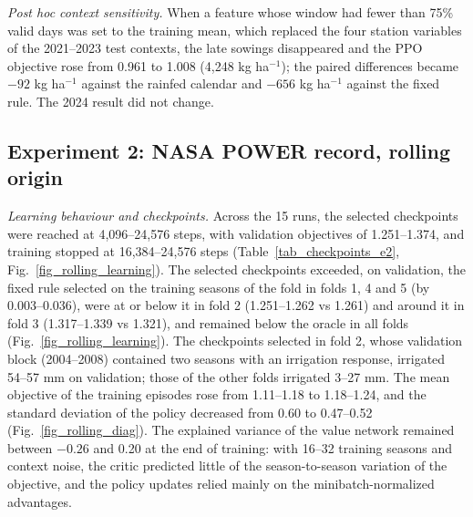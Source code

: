 \documentclass[times,final,authoryear]{elsarticle}
\begin{document}
\emph{Post hoc context sensitivity.} When a feature whose window had fewer than 75\% valid days was set to the training mean, which replaced the four station variables of the 2021--2023 test contexts, the late sowings disappeared and the PPO objective rose from 0.961 to 1.008 (4,248 kg ha$^{-1}$); the paired differences became $-92$ kg ha$^{-1}$ against the rainfed calendar and $-656$ kg ha$^{-1}$ against the fixed rule. The 2024 result did not change.

\subsection{Experiment 2: NASA POWER record, rolling origin}
\label{subres_e2}

\emph{Learning behaviour and checkpoints.} Across the 15 runs, the selected checkpoints were reached at 4,096--24,576 steps, with validation objectives of 1.251--1.374, and training stopped at 16,384--24,576 steps (Table~\ref{tab_checkpoints_e2}, Fig.~\ref{fig_rolling_learning}). The selected checkpoints exceeded, on validation, the fixed rule selected on the training seasons of the fold in folds 1, 4 and 5 (by 0.003--0.036), were at or below it in fold 2 (1.251--1.262 vs 1.261) and around it in fold 3 (1.317--1.339 vs 1.321), and remained below the oracle in all folds (Fig.~\ref{fig_rolling_learning}). The checkpoints selected in fold 2, whose validation block (2004--2008) contained two seasons with an irrigation response, irrigated 54--57 mm on validation; those of the other folds irrigated 3--27 mm. The mean objective of the training episodes rose from 1.11--1.18 to 1.18--1.24, and the standard deviation of the policy decreased from 0.60 to 0.47--0.52 (Fig.~\ref{fig_rolling_diag}). The explained variance of the value network remained between $-0.26$ and 0.20 at the end of training: with 16--32 training seasons and context noise, the critic predicted little of the season-to-season variation of the objective, and the policy updates relied mainly on the minibatch-normalized advantages.
\end{document}
